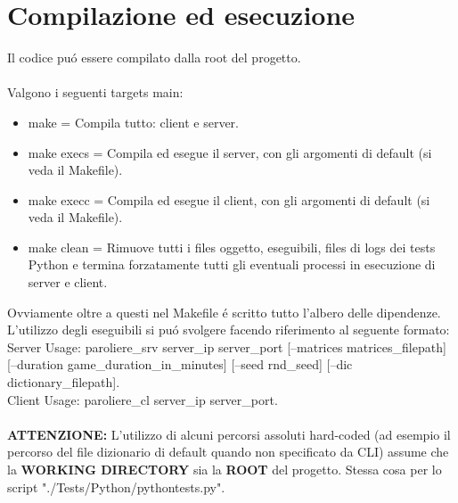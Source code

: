 \chapter{Compilazione ed esecuzione}

Il codice pu\'o essere compilato dalla root del progetto.
\\
\\
Valgono i seguenti targets main:

\begin{itemize}
\item make = Compila tutto: client e server.
\item make execs = Compila ed esegue il server, con gli argomenti di default (si veda il Makefile).
\item make execc = Compila ed esegue il client, con gli argomenti di default (si veda il Makefile).
\item make clean = Rimuove tutti i files oggetto, eseguibili, files di logs dei tests Python e termina forzatamente tutti gli eventuali processi in esecuzione di server e client.
\end{itemize}
\leavevmode 
Ovviamente oltre a questi nel Makefile \'e scritto tutto l'albero delle dipendenze.
\\
L'utilizzo degli eseguibili si pu\'o svolgere facendo riferimento al seguente formato:
\\
Server Usage: paroliere\_srv server\_ip server\_port [--matrices matrices\_filepath] [--duration game\_duration\_in\_minutes] [--seed rnd\_seed] [--dic dictionary\_filepath].
\\
Client Usage: paroliere\_cl server\_ip server\_port.
\\
\\
\textbf{ATTENZIONE:} L'utilizzo di alcuni percorsi assoluti hard-coded (ad esempio il percorso del file dizionario di default quando non specificato da CLI) assume che la \textbf{WORKING DIRECTORY} sia la \textbf{ROOT} del progetto. Stessa cosa per lo script "./Tests/Python/pythontests.py".
